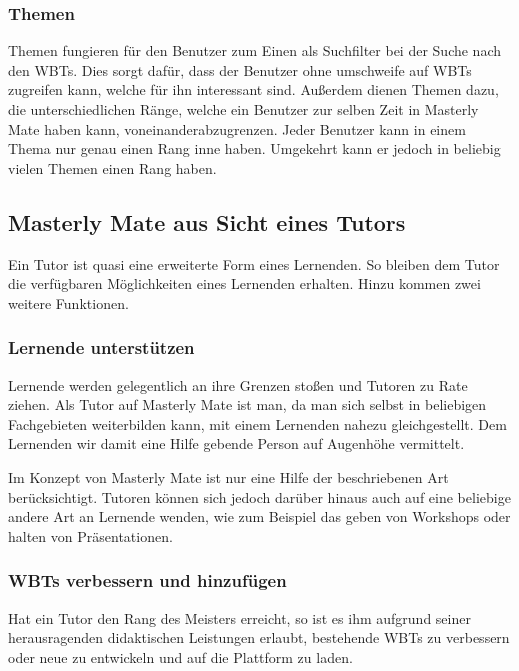 \subsubsection{Themen}
Themen fungieren für den Benutzer zum Einen als Suchfilter bei der Suche nach
den WBTs. Dies sorgt dafür, dass der Benutzer ohne umschweife auf WBTs zugreifen
kann, welche für ihn interessant sind. Außerdem dienen Themen dazu, die
unterschiedlichen Ränge, welche ein Benutzer zur selben Zeit in Masterly Mate
haben kann, voneinanderabzugrenzen. Jeder Benutzer kann in einem Thema nur genau
einen Rang inne haben. Umgekehrt kann er jedoch in beliebig vielen Themen einen
Rang haben.

\subsection{Masterly Mate aus Sicht eines Tutors}
Ein Tutor ist quasi eine erweiterte Form eines Lernenden. So bleiben dem Tutor
die verfügbaren Möglichkeiten eines Lernenden erhalten. Hinzu kommen zwei
weitere Funktionen.

\subsubsection{Lernende unterstützen}
Lernende werden gelegentlich an ihre Grenzen stoßen und Tutoren zu Rate ziehen.
Als Tutor auf Masterly Mate ist man, da man sich selbst in beliebigen
Fachgebieten weiterbilden kann, mit einem Lernenden nahezu gleichgestellt. Dem
Lernenden wir damit eine Hilfe gebende Person auf Augenhöhe vermittelt. 

Im Konzept von Masterly Mate ist nur eine Hilfe der beschriebenen Art
berücksichtigt. Tutoren können sich jedoch darüber hinaus auch auf eine
beliebige andere Art an Lernende wenden, wie zum Beispiel das geben von
Workshops oder halten von Präsentationen.

\subsubsection{WBTs verbessern und hinzufügen}
Hat ein Tutor den Rang des Meisters erreicht, so ist es ihm aufgrund seiner
herausragenden didaktischen Leistungen erlaubt, bestehende WBTs zu verbessern
oder neue zu entwickeln und auf die Plattform zu laden.